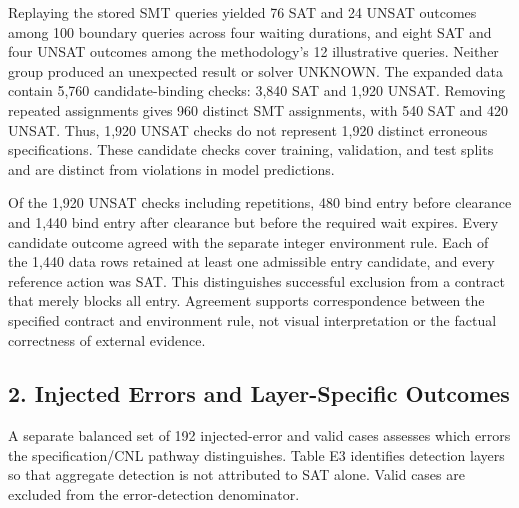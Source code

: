 \documentclass[11pt,a4paper]{article}
\begin{document}
Replaying the stored SMT queries yielded 76 SAT and 24 UNSAT outcomes among 100 boundary queries across four waiting durations, and eight SAT and four UNSAT outcomes among the methodology's 12 illustrative queries. Neither group produced an unexpected result or solver UNKNOWN. The expanded data contain 5,760 candidate-binding checks: 3,840 SAT and 1,920 UNSAT. Removing repeated assignments gives 960 distinct SMT assignments, with 540 SAT and 420 UNSAT. Thus, 1,920 UNSAT checks do not represent 1,920 distinct erroneous specifications. These candidate checks cover training, validation, and test splits and are distinct from violations in model predictions.\par

Of the 1,920 UNSAT checks including repetitions, 480 bind entry before clearance and 1,440 bind entry after clearance but before the required wait expires. Every candidate outcome agreed with the separate integer environment rule. Each of the 1,440 data rows retained at least one admissible entry candidate, and every reference action was SAT. This distinguishes successful exclusion from a contract that merely blocks all entry. Agreement supports correspondence between the specified contract and environment rule, not visual interpretation or the factual correctness of external evidence.\par

\subsection*{2. Injected Errors and Layer-Specific Outcomes}

A separate balanced set of 192 injected-error and valid cases assesses which errors the specification/CNL pathway distinguishes. Table E3 identifies detection layers so that aggregate detection is not attributed to SAT alone. Valid cases are excluded from the error-detection denominator.\par
\end{document}
